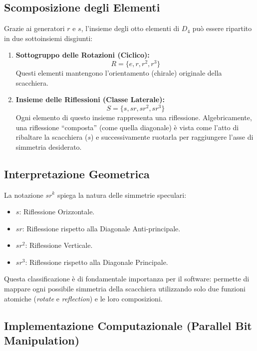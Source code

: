 \subsection{Scomposizione degli Elementi}
Grazie ai generatori $r$ e $s$, l'insieme degli otto elementi di $D_4$ può essere ripartito in due sottoinsiemi disgiunti:
\begin{enumerate}
    \item \textbf{Sottogruppo delle Rotazioni (Ciclico):}
    \begin{equation}
        R = \{e, r, r^2, r^3\}
    \end{equation}
    Questi elementi mantengono l'orientamento (chirale) originale della scacchiera.

    \item \textbf{Insieme delle Riflessioni (Classe Laterale):}
    \begin{equation}
        S = \{s, sr, sr^2, sr^3\}
    \end{equation}
    Ogni elemento di questo insieme rappresenta una riflessione. Algebricamente, una riflessione ``composta'' (come quella diagonale) è vista come l'atto di ribaltare la scacchiera ($s$) e successivamente ruotarla per raggiungere l'asse di simmetria desiderato.
\end{enumerate}

\subsection{Interpretazione Geometrica}
La notazione $sr^k$ spiega la natura delle simmetrie speculari:
\begin{itemize}
    \item $s$: Riflessione Orizzontale.
    \item $sr$: Riflessione rispetto alla Diagonale Anti-principale.
    \item $sr^2$: Riflessione Verticale.
    \item $sr^3$: Riflessione rispetto alla Diagonale Principale.
\end{itemize}
Questa classificazione è di fondamentale importanza per il software: permette di mappare ogni possibile simmetria della scacchiera utilizzando solo due funzioni atomiche (\textit{rotate} e \textit{reflection}) e le loro composizioni.

\subsection{Implementazione Computazionale (Parallel Bit Manipulation)}

